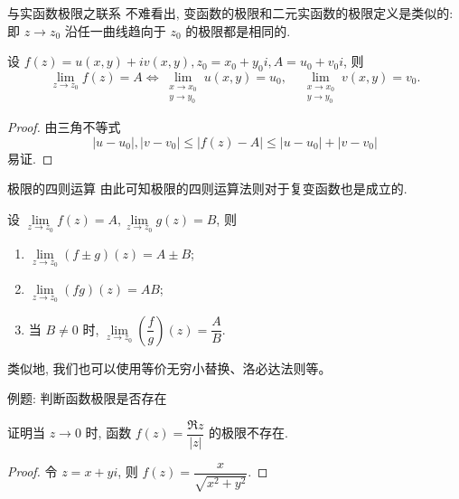 \begin{frame}{与实函数极限之联系}
\onslide<+->
不难看出, 变函数的极限和二元实函数的极限定义是类似的:
\onslide<+->
即 $z\to z_0$ 沿任一曲线趋向于 $z_0$ 的极限都是相同的.
\onslide<+->
\begin{theorem}
设 $f(z)=u(x,y)+iv(x,y),z_0=x_0+y_0i,A=u_0+v_0i$, 则
\[\lim_{z\to z_0}f(z)=A\iff
\lim_{\substack{x\to x_0\\y\to y_0}}u(x,y)=u_0,\quad
\lim_{\substack{x\to x_0\\y\to y_0}}v(x,y)=v_0.\]
\vspace{-0.5\baselineskip}
\end{theorem}
\onslide<+->
\begin{proof}
由三角不等式
\[|u-u_0|,|v-v_0|\le|f(z)-A|\le|u-u_0|+|v-v_0|\]
易证.
\end{proof}
\end{frame}


\begin{frame}{极限的四则运算}
\onslide<+->
由此可知极限的四则运算法则对于复变函数也是成立的.
\onslide<+->
\begin{theorem}
设 $\lim\limits_{z\to z_0}f(z)=A,\lim\limits_{z\to z_0}g(z)=B$, 则
\begin{enumerate}
\item $\lim\limits_{z\to z_0}(f\pm g)(z)=A\pm B$;
\item $\lim\limits_{z\to z_0}(fg)(z)=AB$;
\item 当 $B\neq 0$ 时, $\lim\limits_{z\to z_0}\left(\dfrac fg\right)(z)=\dfrac AB$.
\end{enumerate}
\end{theorem}
\onslide<+->
类似地, 我们也可以使用等价无穷小替换、洛必达法则等。
\end{frame}


\begin{frame}{例题: 判断函数极限是否存在}
\onslide<+->
\begin{example}
证明当 $z\to0$ 时, 函数 $f(z)=\dfrac{\Re z}{|z|}$ 的极限不存在.
\end{example}
\onslide<+->
\begin{proof}
令 $z=x+yi$, 则 $f(z)=\dfrac x{\sqrt{x^2+y^2}}$.

\end{proof}
\end{frame}

